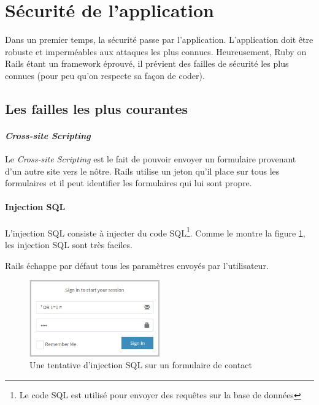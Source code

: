 \documentclass[]{report}
\begin{document}
  \section{Sécurité de l'application}

    Dans un premier temps, la sécurité passe par l'application. L'application doit être robuste et imperméables aux attaques les plus connues. Heureusement, Ruby on Rails étant un framework éprouvé, il prévient des failles de sécurité les plus connues (pour peu qu'on respecte sa façon de coder).

    \subsection{Les failles les plus courantes}


      \paragraph{\textit{Cross-site Scripting}}

        Le \textit{Cross-site Scripting} est le fait de pouvoir envoyer un formulaire provenant d'un autre site vers le nôtre. Rails utilise un jeton qu'il place sur tous les formulaires et il peut identifier les formulaires qui lui sont propre.

      \paragraph{Injection SQL}

        L'injection SQL consiste à injecter du code SQL\footnote{Le code SQL est utilisé pour envoyer des requêtes sur la base de données}. Comme le montre la figure \ref{fig:sql_injection}, les injection SQL sont très faciles.

        Rails échappe par défaut tous les paramètres envoyés par l’utilisateur.

        \begin{figure}
          \centering
          \includegraphics[width=0.5\textwidth]{img/sql_injection.png}
          \caption{Une tentative d'injection SQL sur un formulaire de contact}
          \label{fig:sql_injection}
        \end{figure}
\end{document}
